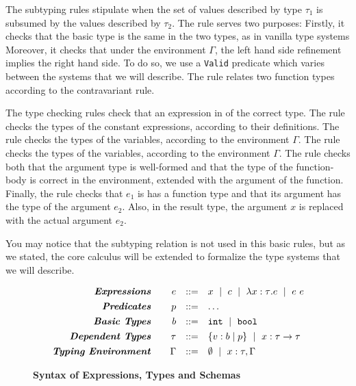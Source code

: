 The subtyping rules stipulate when the set of values described 
by type $\tau_1$ is subsumed by the values described by $\tau_2$.
%
The rule \tsubBase serves two purposes:
Firstly,
it checks that the basic type is the same in the two types, 
as in vanilla type systems
Moreover, it checks that under the environment $\Gamma$, 
the left hand side refinement implies the right hand side.
To do so, we use a \texttt{Valid} predicate which varies between the systems that we will describe.
%
The rule \tsubFun relates two function types according to the contravariant rule.

The type checking rules check that an expression in of the correct type.
The rule \tconst checks the types of the constant expressions, according 
to their definitions.
The rule \tvar checks the types of the variables, according 
to the environment $\Gamma$.
The rule \tfun checks the types of the variables, according 
to the environment $\Gamma$.
The rule \tfunction checks both that the argument type is well-formed 
and that the type of the function-body
is correct in the environment, extended with the argument of the function.
Finally, the rule \tapp checks that $e_1$ is has a function type
and that its argument has the type of the argument $e_2$.
Also, in the result type, the argument $x$ is replaced with the actual argument $e_2$.

You may notice that the subtyping relation 
is not used in this basic rules,
but as we stated, the core calculus will be extended to formalize the
type systems that we will describe.

\begin{figure}[t!]
\centering
$$
\begin{array}{rrcl}
\emphbf{Expressions} \quad 
  & e 
  & ::= 
  &      x 
  \spmid c 
  \spmid \efunt{x}{\tau}{e} 
  \spmid \eapp{e}{e} 
  \\[0.05in] 

\emphbf{Predicates} \quad 
  & p
  & ::= 
  & \dots
  \\[0.05in] 

\emphbf{Basic Types} \quad 
  & b 
  & ::= 
  &      \tbint
  \spmid \tbbool
  \\[0.05in]

\emphbf{Dependent Types} \quad 
  & \tau 
  & ::= 
  &      \tref{b}{p} 
  \spmid \tfun{x}{\tau}{\tau}
  \\[0.05in]

\emphbf{Typing Environment} \quad 
  & \Gamma 
  & ::= 
  &      \emptyset 
  \spmid x:\tau, \Gamma

\end{array}
$$
\caption{\textbf{Syntax of Expressions, Types and Schemas}}
\label{fig:syntax}
\end{figure}


